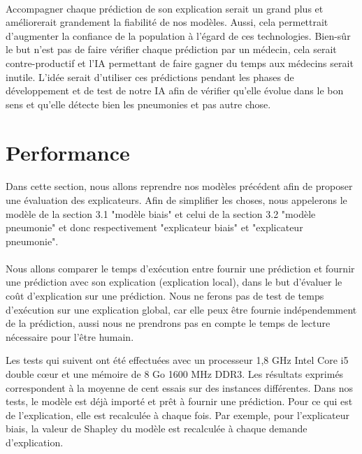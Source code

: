 \paragraph{}Accompagner chaque prédiction de son explication serait un grand plus et améliorerait grandement la fiabilité de nos modèles. Aussi, cela permettrait d'augmenter la confiance de la population à l'égard de ces technologies. Bien-sûr le but n'est pas de faire vérifier chaque prédiction par un médecin, cela serait contre-productif et l'IA permettant de faire gagner du temps aux médecins serait inutile. L'idée serait d'utiliser ces prédictions pendant les phases de développement et de test de notre IA afin de vérifier qu'elle évolue dans le bon sens et qu'elle détecte bien les pneumonies et pas autre chose.

\section{Performance}
\paragraph{}Dans cette section, nous allons reprendre nos modèles précédent afin de proposer une évaluation des explicateurs. Afin de simplifier les choses, nous appelerons le modèle de la section 3.1 "modèle biais" et celui de la section 3.2 "modèle pneumonie" et donc respectivement "explicateur biais" et "explicateur pneumonie".

\paragraph{}Nous allons comparer le temps d'exécution entre fournir une prédiction et fournir une prédiction avec son explication (explication local), dans le but d'évaluer le coût d'explication sur une prédiction. Nous ne ferons pas de test de temps d'exécution sur une explication global, car elle peux être fournie indépendemment de la prédiction, aussi nous ne prendrons pas en compte le temps de lecture nécessaire pour l'être humain.\par
Les tests qui suivent ont été effectuées avec un processeur 1,8 GHz Intel Core i5 double cœur et une mémoire de 8 Go 1600 MHz DDR3. Les résultats exprimés correspondent à la moyenne de cent essais sur des instances différentes. Dans nos tests, le modèle est déjà importé et prêt à fournir une prédiction. Pour ce qui est de l'explication, elle est recalculée à chaque fois. Par exemple, pour l'explicateur biais, la valeur de Shapley du modèle est recalculée à chaque demande d'explication.

